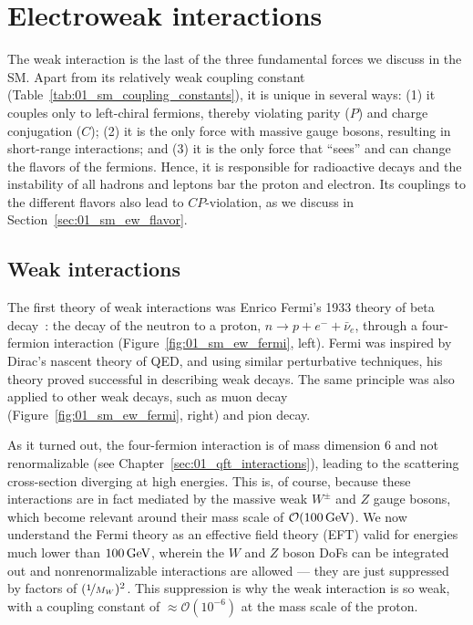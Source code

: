 

\section{Electroweak interactions}
\label{sec:01_sm_ew}

The weak interaction is the last of the three fundamental forces we discuss in the SM.
Apart from its relatively weak coupling constant (Table~\ref{tab:01_sm_coupling_constants}), it is unique in several ways: (1) it couples only to left-chiral fermions, thereby violating parity ($P$) and charge conjugation ($C$); (2) it is the only force with massive gauge bosons, resulting in short-range interactions; and (3) it is the only force that ``sees'' and can change the flavors of the fermions.
Hence, it is responsible for radioactive decays and the instability of all hadrons and leptons bar the proton and electron.
Its couplings to the different flavors also lead to $CP$-violation, as we discuss in Section~\ref{sec:01_sm_ew_flavor}.

\subsection{Weak interactions}
\label{sec:01_sm_ew_weak}

The first theory of weak interactions was Enrico Fermi's 1933 theory of beta decay~\cite{Fermi:1934hr}: the decay of the neutron to a proton, $n \to p + e^- + \bar\nu_e$, through a four-fermion interaction (Figure~\ref{fig:01_sm_ew_fermi}, left).
Fermi was inspired by Dirac's nascent theory of QED, and using similar perturbative techniques, his theory proved successful in describing weak decays.
The same principle was also applied to other weak decays, such as muon decay (Figure~\ref{fig:01_sm_ew_fermi}, right) and pion decay.

As it turned out, the four-fermion interaction is of mass dimension $6$ and not renormalizable (see Chapter~\ref{sec:01_qft_interactions}), leading to the scattering cross-section diverging at high energies.
This is, of course, because these interactions are in fact mediated by the massive weak $W^\pm$ and $Z$ gauge bosons, which become relevant around their mass scale of $\mathcal O(100\,\text{Ge\hspace{-.08em}V})$.
We now understand the Fermi theory as an effective field theory (EFT) valid for energies much lower than $100 \,\text{Ge\hspace{-.08em}V}$, wherein the $W$ and $Z$ boson DoFs can be integrated out and nonrenormalizable interactions are allowed --- they are just suppressed by factors of $(\cnicefrac{1}{M_W})^2$.
This suppression is why the weak interaction is so weak, with a coupling constant of $\approx \mathcal O(10^{-6})$ at the mass scale of the proton.

